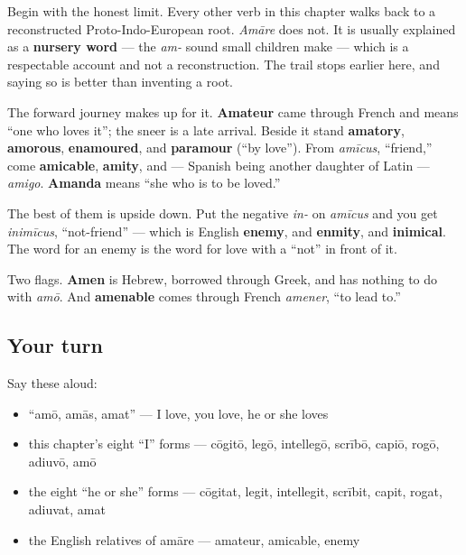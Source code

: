 \begin{cousinweb}
Begin with the honest limit. Every other verb in this chapter walks back to a reconstructed Proto-Indo-European root. \emph{Amāre} does not. It is usually explained as a \textbf{nursery word} — the \emph{am-} sound small children make — which is a respectable account and not a reconstruction. The trail stops earlier here, and saying so is better than inventing a root.

The forward journey makes up for it. \textbf{Amateur} came through French and means \textquotedblleft{}one who loves it\textquotedblright{}; the sneer is a late arrival. Beside it stand \textbf{amatory}, \textbf{amorous}, \textbf{enamoured}, and \textbf{paramour} (\textquotedblleft{}by love\textquotedblright{}). From \emph{amīcus}, \textquotedblleft{}friend,\textquotedblright{} come \textbf{amicable}, \textbf{amity}, and — Spanish being another daughter of Latin — \emph{amigo}. \textbf{Amanda} means \textquotedblleft{}she who is to be loved.\textquotedblright{}

The best of them is upside down. Put the negative \emph{in-} on \emph{amīcus} and you get \emph{inimīcus}, \textquotedblleft{}not-friend\textquotedblright{} — which is English \textbf{enemy}, and \textbf{enmity}, and \textbf{inimical}. The word for an enemy is the word for love with a \textquotedblleft{}not\textquotedblright{} in front of it.

Two flags. \textbf{Amen} is Hebrew, borrowed through Greek, and has nothing to do with \emph{amō}. And \textbf{amenable} comes through French \emph{amener}, \textquotedblleft{}to lead to.\textquotedblright{}
\end{cousinweb}

\subsection*{Your turn}
Say these aloud:

\begin{itemize}
\raggedright
  \item \textquotedblleft{}amō, amās, amat\textquotedblright{} — I love, you love, he or she loves
  \item this chapter's eight \textquotedblleft{}I\textquotedblright{} forms — cōgitō, legō, intellegō, scrībō, capiō, rogō, adiuvō, amō
  \item the eight \textquotedblleft{}he or she\textquotedblright{} forms — cōgitat, legit, intellegit, scrībit, capit, rogat, adiuvat, amat
  \item the English relatives of amāre — amateur, amicable, enemy
\end{itemize}


